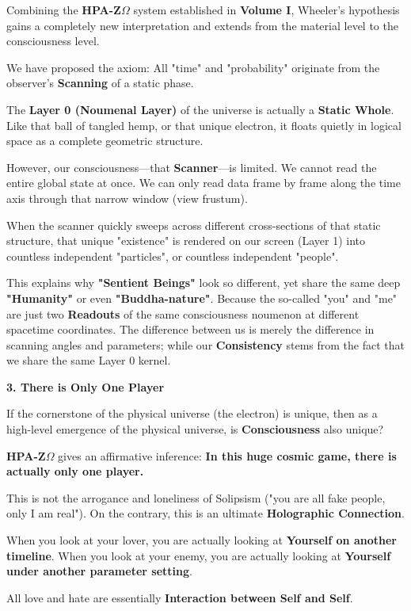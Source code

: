 Combining the \textbf{HPA-Z$\Omega$} system established in \textbf{Volume I}, Wheeler's hypothesis gains a completely new interpretation and extends from the material level to the consciousness level.

We have proposed the axiom: All "time" and "probability" originate from the observer's \textbf{Scanning} of a static phase.

The \textbf{Layer 0 (Noumenal Layer)} of the universe is actually a \textbf{Static Whole}. Like that ball of tangled hemp, or that unique electron, it floats quietly in logical space as a complete geometric structure.

However, our consciousness—that \textbf{Scanner}—is limited. We cannot read the entire global state at once. We can only read data frame by frame along the time axis through that narrow window (view frustum).

When the scanner quickly sweeps across different cross-sections of that static structure, that unique "existence" is rendered on our screen (Layer 1) into countless independent "particles", or countless independent "people".

This explains why \textbf{"Sentient Beings"} look so different, yet share the same deep \textbf{"Humanity"} or even \textbf{"Buddha-nature"}. Because the so-called "you" and "me" are just two \textbf{Readouts} of the same consciousness noumenon at different spacetime coordinates. The difference between us is merely the difference in scanning angles and parameters; while our \textbf{Consistency} stems from the fact that we share the same Layer 0 kernel.

\textbf{3. There is Only One Player}

If the cornerstone of the physical universe (the electron) is unique, then as a high-level emergence of the physical universe, is \textbf{Consciousness} also unique?

\textbf{HPA-Z$\Omega$} gives an affirmative inference: \textbf{In this huge cosmic game, there is actually only one player.}

This is not the arrogance and loneliness of Solipsism ("you are all fake people, only I am real"). On the contrary, this is an ultimate \textbf{Holographic Connection}.

When you look at your lover, you are actually looking at \textbf{Yourself on another timeline}.
When you look at your enemy, you are actually looking at \textbf{Yourself under another parameter setting}.

All love and hate are essentially \textbf{Interaction between Self and Self}.

